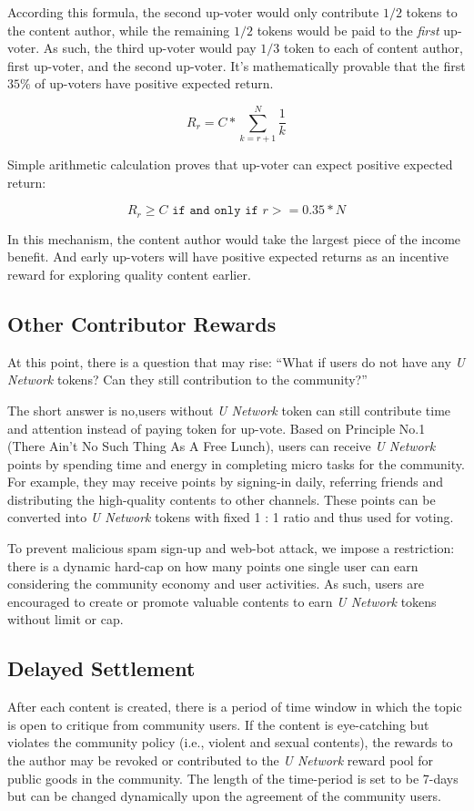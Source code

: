 According this formula, the second up-voter would only contribute $1/2$ tokens to the content author, while the remaining $1/2$ tokens would be paid to the \emph{first} up-voter. As such, the third up-voter would pay $1/3$ token to each of content author, first up-voter, and the second up-voter. It's mathematically provable that the first $35\%$ of up-voters have positive expected return.     
\begin{center}
$$R_r = C * \sum_{k=r+1}^{N} \frac{1}{k}$$ 
\end{center}
Simple arithmetic calculation proves that up-voter can expect positive expected return:
\begin{center}
$$R_r \geq C \texttt{ if and only if } {r}>=0.35*{N} $$
\end{center}
In this mechanism, the content author would take the largest piece of the income benefit. And early up-voters will have positive expected returns as an incentive reward for exploring quality content earlier. 


\subsection{Other Contributor Rewards}
At this point, there is a question that may rise: ``What if users do not have any \emph{U Network}  tokens? Can they still contribution to the community?''

The short answer is no,users without \emph{U Network}  token can still contribute time and attention instead of paying token for up-vote. Based on Principle No.1 (There Ain't No Such Thing As A Free Lunch), users can receive \emph{U Network}  points by spending time and energy in completing micro tasks for the community. For example, they may receive points by signing-in daily, referring friends and distributing the high-quality contents to other channels. These points can be converted into \emph{U Network}  tokens with fixed 1 : 1 ratio and thus used for voting.  

To prevent malicious spam sign-up and web-bot attack, we impose a restriction: there is a dynamic hard-cap on how many points one single user can earn considering the community economy and user activities. As such, users are encouraged to create or promote valuable contents to earn \emph{U Network} tokens without limit or cap. 

\subsection{Delayed Settlement}
After each content is created, there is a period of time window in which the topic is open to critique from community users. If the content is eye-catching but violates the community policy (i.e., violent and sexual contents), the rewards to the author may be revoked or contributed to the \emph{U Network} reward pool for public goods in the community. The length of the time-period is set to be 7-days but can be changed dynamically upon the agreement of the community users.

